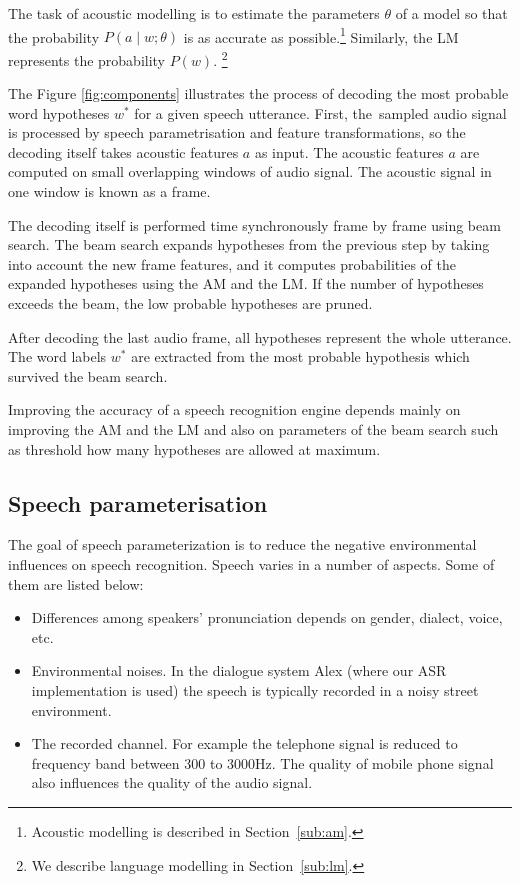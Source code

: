 The task of acoustic modelling is to estimate the parameters $\theta$ of a model so that the probability $P(a \mid w ; \theta)$ is as accurate as possible.\footnote{Acoustic modelling is described in Section~\ref{sub:am}.} Similarly, the \ac{LM} represents the probability $P(w)$. \footnote{We describe language modelling in Section~\ref{sub:lm}.}

The Figure \ref{fig:components} illustrates the process of decoding the most probable word hypotheses $w^*$ for a given speech utterance. 
First, the~sampled audio signal is processed by speech parametrisation and feature transformations, so the decoding itself takes acoustic features $a$ as input. The acoustic features $a$ are computed on small overlapping windows of audio signal. The acoustic signal in one window is known as a frame.

The decoding itself is performed time synchronously frame by frame using beam search. The beam search expands hypotheses from the previous step by taking into account the new frame features, and it computes probabilities of the expanded hypotheses using the \ac{AM} and the \ac{LM}. If the number of hypotheses exceeds the beam, the low probable hypotheses are pruned. %

After decoding the last audio frame, all hypotheses represent the whole utterance. The word labels $w^*$ are extracted from the most probable hypothesis which survived the beam search.

Improving the accuracy of a speech recognition engine depends mainly on improving the \ac{AM} and the \ac{LM} and also on parameters of the beam search such as threshold how many hypotheses are allowed at maximum.


\subsection{Speech parameterisation}
\label{sub:param}
The goal of speech parameterization is to reduce the negative environmental influences on speech recognition. Speech varies in a number of aspects. Some of them are listed below:

\begin{itemize}
\item Differences among speakers' pronunciation depends on gender, dialect, voice, etc.
\item Environmental noises. In the dialogue system Alex (where our \ac{ASR} implementation is used) the speech is typically recorded in a noisy street environment.
\item The recorded channel.
  For example the telephone signal is reduced to frequency band between 300 to 3000Hz.
  The quality of mobile phone signal also influences the quality of the audio signal.
\end{itemize}

